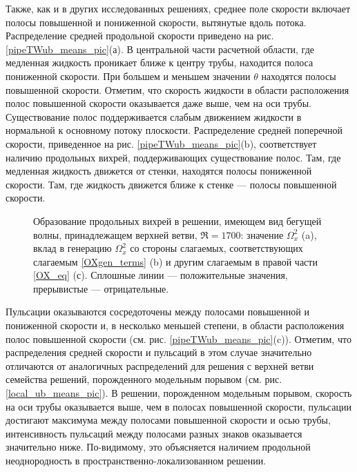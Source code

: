 Также, как и в других исследованных решениях, среднее поле скорости включает полосы повышенной и пониженной скорости, вытянутые вдоль потока. Распределение средней продольной скорости приведено на рис. \ref{pipeTWub_means_pic}(а). В центральной части расчетной области, где медленная жидкость проникает ближе к центру трубы, находится полоса пониженной скорости. При большем и меньшем значении $\theta$ находятся полосы повышенной скорости. Отметим, что скорость жидкости в области расположения полос повышенной скорости оказывается даже выше, чем на оси трубы. Существование полос поддерживается слабым движением жидкости в нормальной к основному потоку плоскости. Распределение средней поперечной скорости, приведенное на рис. \ref{pipeTWub_means_pic}(b), соответствует наличию продольных вихрей, поддерживающих существование полос. Там, где медленная жидкость движется от стенки, находятся полосы пониженной скорости. Там, где жидкость движется ближе к стенке --- полосы повышенной скорости. 

\begin{figure}
\caption{Образование продольных вихрей в решении, имеющем вид бегущей волны, принадлежащем верхней ветви, $\Re = 1700$: значение $\Omega_x^2$ (a), вклад в генерацию $\Omega_x^2$ со стороны слагаемых, соответствующих слагаемым \eqref{OXgen_terms} (b) и другим слагаемым в правой части \eqref{OX_eq} (с). Сплошные линии --- положительные значения, прерывистые --- отрицательные.}
\label{pipeTWub_OXgen_pic}
\end{figure}

Пульсации оказываются сосредоточены между полосами повышенной и пониженной скорости и, в несколько меньшей степени, в области расположения полос повышенной скорости (см. рис. \ref{pipeTWub_means_pic}(c)). Отметим, что распределения средней скорости и пульсаций в этом случае значительно отличаются от аналогичных распределений для решения с верхней ветви семейства решений, порожденного модельным порывом (см. рис. \ref{local_ub_means_pic}). В решении, порожденном модельным порывом, скорость на оси трубы оказывается выше, чем в полосах повышенной скорости, пульсации достигают максимума между полосами повышенной скорости и осью трубы, интенсивность пульсаций между полосами разных знаков оказывается значительно ниже. По-видимому, это объясняется наличием продольной неоднородность в пространственно-локализованном решении. 

